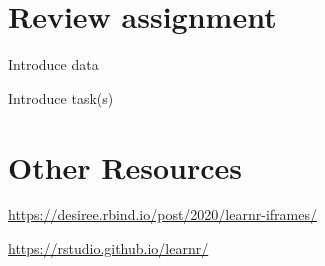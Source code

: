 \documentclass[
]{book}
\begin{document}
\hypertarget{review-assignment-4}{%
\section*{Review assignment}\label{review-assignment-4}}

Introduce data

Introduce task(s)

\hypertarget{other-resources-4}{%
\section{Other Resources}\label{other-resources-4}}

\url{https://desiree.rbind.io/post/2020/learnr-iframes/}

\url{https://rstudio.github.io/learnr/}

  
\end{document}

